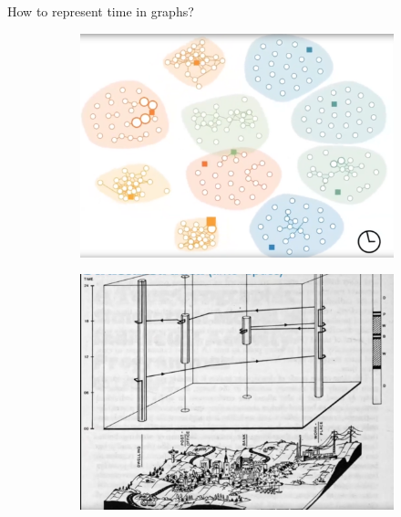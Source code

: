 \documentclass{beamer}
\begin{document}
\begin{frame}{How to represent time in graphs?}
\begin{figure}
        \begin{subfigure}{0.45\textwidth}
            \centering
            \includegraphics[width=\textwidth]{media/temporal_sense_3.png}
        \end{subfigure}
        \hfill
        \begin{subfigure}{0.45\textwidth}
            \centering
            \includegraphics[width=\textwidth]{media/temporal_sense_4.png}
        \end{subfigure}
    \end{figure}
\end{frame}
\end{document}
